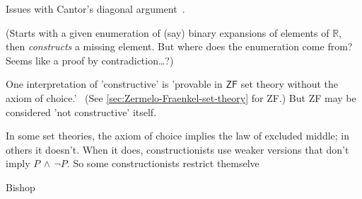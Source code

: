 \label{sec:Cardinality_of_R}

Issues with Cantor's diagonal 
argument~\cite{wiki:Cantors_diagonal_argument}.

(Starts with a given enumeration of (say) binary expansions of 
elements of $\mathbb{R}$, then \textit{constructs} a missing
element. But where does the enumeration come from?
Seems like a proof by contradiction\ldots?)

\label{sec:Axiom_of_choice}

One interpretation of 'constructive' is
'provable in $\textsf{ZF}$ set theory without the axiom of 
choice.'~\cite{iep:Set_theory,wiki:Axiom_of_choice}
(See \autoref{sec:Zermelo-Fraenkel-set-theory} for \textsf{ZF}.)
But \textsf{ZF} may be considered 'not constructive'
itself.

In some set theories, the axiom of choice implies
the law of excluded middle; in others it doesn't.
When it does, constructionists use weaker versions
that don't imply $P \, \wedge \, \lnot P$.
So some constructionists restrict themselve

\label{sec:Measure_theory}

Bishop~\cite{bishop1967foundations,bishop1972constructive,bishop1985constructive}

 